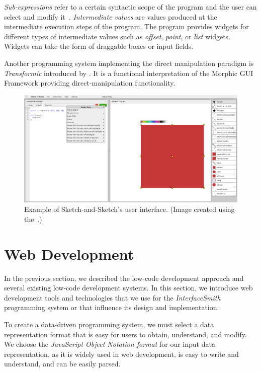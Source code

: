 \emph{Sub-expressions} refer to a certain syntactic scope of the program and the user can select and modify it~\cite{output-directed-programming}.
\emph{Intermediate values} are values produced at the intermediate execution steps of the program.
The program provides widgets for different types of intermediate values such as \emph{offset}, \emph{point}, or \emph{list} widgets.
Widgets can take the form of draggable boxes or input fields.

Another programming system implementing the direct manipulation paradigm is \emph{Transformic} introduced by \citet{Schreiber_Krahn_Ingalls_Hirschfeld_2017}.
It is a functional interpretation of the Morphic GUI Framework providing direct-manipulation functionality.

\begin{figure}[htbp]
	\centering
	\includegraphics[width=1\linewidth]{img/sketch.pdf}
	\caption{Example of Sketch-and-Sketch's user interface. (Image created using the~\citet{Sketch-n-Sketch-app}.) }
	\label{fig:sketch}
\end{figure}

\newpage
\section{Web Development}
In the previous section, we described the low-code development approach and several existing low-code development systems.
In this section, we introduce web development tools and technologies that we use for the \emph{InterfaceSmith} programming system or that influence its design and implementation.

To create a data-driven programming system, we must select a data representation format that is easy for users to obtain, understand, and modify.
We choose the \emph{JavaScript Object Notation format} for our input data representation, as it is widely used in web development, is easy to write and understand, and can be easily parsed.

